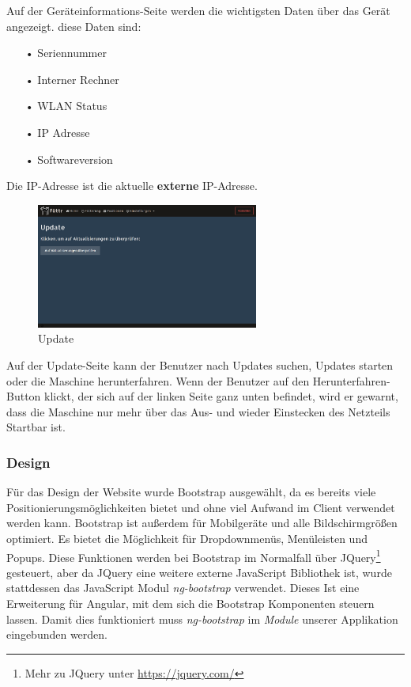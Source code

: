 Auf der Geräteinformations-Seite werden die wichtigsten Daten über das Gerät angezeigt. diese Daten sind:
\begin{itemize}
\item[•]Seriennummer
\item[•]Interner Rechner
\item[•]WLAN Status
\item[•]IP Adresse
\item[•]Softwareversion
\end{itemize}
Die IP-Adresse ist die aktuelle \textbf{externe} IP-Adresse. \newpage

\begin{figure}
\vspace{-10pt}
  \begin{center}
    \includegraphics[width=0.65\textwidth]{Bilder/Greistorfer/Update}
  \end{center}
  \caption{Update}
  \label{Update}
  \vspace{-10pt}
\end{figure}

Auf der Update-Seite kann der Benutzer nach Updates suchen, Updates starten oder die Maschine herunterfahren. Wenn der Benutzer auf den Herunterfahren-Button klickt, der sich auf der linken Seite ganz unten befindet, wird er gewarnt, dass die Maschine nur mehr über das Aus- und wieder Einstecken des Netzteils Startbar ist.\\

\subsubsection{Design}
\label{sec:ums-client-design}
Für das Design der Website wurde Bootstrap ausgewählt, da es bereits viele Positionierungsmöglichkeiten bietet und ohne viel Aufwand im Client verwendet werden kann. Bootstrap ist außerdem für Mobilgeräte und alle Bildschirmgrößen optimiert. Es bietet die Möglichkeit für Dropdownmenüs, Menüleisten und Popups. Diese Funktionen werden bei Bootstrap im Normalfall über JQuery\footnote{Mehr zu JQuery unter \url{https://jquery.com/}} gesteuert, aber da JQuery eine weitere externe JavaScript Bibliothek ist, wurde stattdessen das JavaScript Modul \textit{ng-bootstrap} verwendet. Dieses Ist eine Erweiterung für Angular, mit dem sich die Bootstrap Komponenten steuern lassen. Damit dies funktioniert muss \textit{ng-bootstrap} im \textit{Module} unserer Applikation eingebunden werden.

